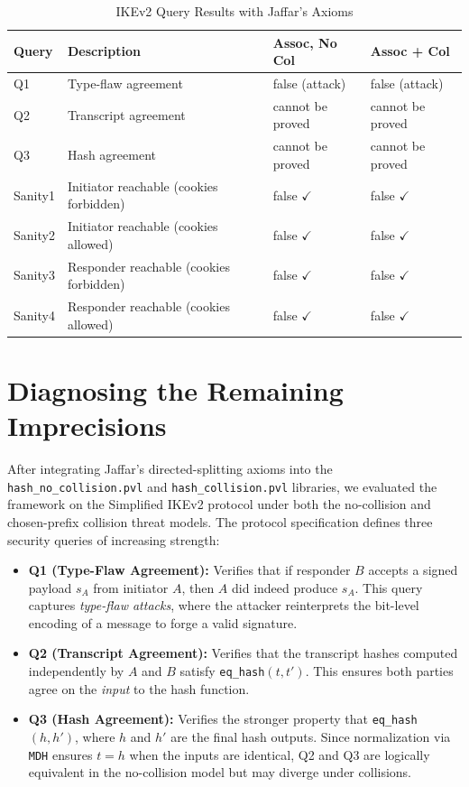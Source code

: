 \documentclass[journal]{IEEEtran}
\begin{document}
\begin{table}[t]
\centering
\caption{IKEv2 Query Results with Jaffar's Axioms}
\label{tab:query_results}
\renewcommand{\arraystretch}{1.3} 
\begin{tabular}{|l|l|l|l|}
\hline
\textbf{Query} & \textbf{Description} & \textbf{Assoc, No Col} & \textbf{Assoc + Col} \\ \hline
Q1 & Type-flaw agreement & false (attack) & false (attack) \\ \hline
Q2 & Transcript agreement & cannot be proved & cannot be proved \\ \hline
Q3 & Hash agreement & cannot be proved & cannot be proved \\ \hline
Sanity1 & Initiator reachable (cookies forbidden) & false $\checkmark$ & false $\checkmark$ \\ \hline
Sanity2 & Initiator reachable (cookies allowed) & false $\checkmark$ & false $\checkmark$ \\ \hline
Sanity3 & Responder reachable (cookies forbidden) & false $\checkmark$ & false $\checkmark$ \\ \hline
Sanity4 & Responder reachable (cookies allowed) & false $\checkmark$ & false $\checkmark$ \\ \hline
\end{tabular}
\end{table}

\section{Diagnosing the Remaining Imprecisions}

After integrating Jaffar's directed-splitting axioms into the \texttt{hash\_no\_collision.pvl} and \texttt{hash\_collision.pvl} libraries, we evaluated the framework on the Simplified IKEv2 protocol under both the no-collision and chosen-prefix collision threat models. The protocol specification defines three security queries of increasing strength:

\begin{itemize}
    \item \textbf{Q1 (Type-Flaw Agreement):} Verifies that if responder $B$ accepts a signed payload $s_A$ from initiator $A$, then $A$ did indeed produce $s_A$. This query captures \emph{type-flaw attacks}, where the attacker reinterprets the bit-level encoding of a message to forge a valid signature. 
    \item \textbf{Q2 (Transcript Agreement):} Verifies that the transcript hashes computed independently by $A$ and $B$ satisfy \texttt{eq\_hash}$(t, t')$. This ensures both parties agree on the \emph{input} to the hash function.
    \item \textbf{Q3 (Hash Agreement):} Verifies the stronger property that \texttt{eq\_hash}$(h, h')$, where $h$ and $h'$ are the final hash outputs. Since normalization via \texttt{MDH} ensures $t = h$ when the inputs are identical, Q2 and Q3 are logically equivalent in the no-collision model but may diverge under collisions.
\end{itemize}
\end{document}
